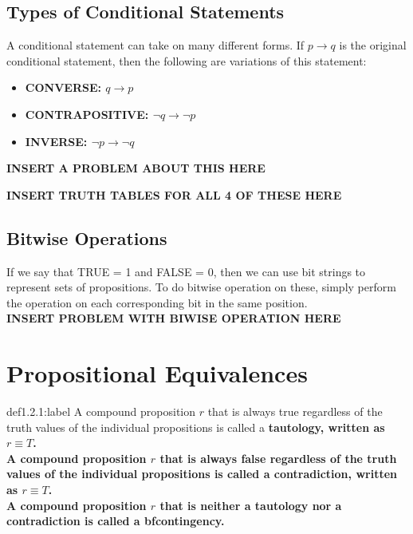 \subsection{Types of Conditional Statements}

A conditional statement can take on many different forms. If $p \rightarrow q$ is the original conditional statement, then the following are variations of this statement:

\begin{itemize}
    \item \bf{CONVERSE:} $q \rightarrow p$
    \item \bf{CONTRAPOSITIVE:} $\neg q \rightarrow \neg p$
    \item \bf{INVERSE:} $\neg p \rightarrow \neg q$
\end{itemize}

\bf{INSERT A PROBLEM ABOUT THIS HERE}

\bf{INSERT TRUTH TABLES FOR ALL 4 OF THESE HERE}


\subsection{Bitwise Operations}

If we say that TRUE = 1 and FALSE = 0, then we can use bit strings to represent sets of propositions. To do bitwise operation on these, simply perform the operation on each corresponding bit in the same position.\\

\bf{INSERT PROBLEM WITH BIWISE OPERATION HERE}



\section{Propositional Equivalences}

\begin{definition}{def1.2.1:label}
    A compound proposition $r$ that is always true regardless of the truth values of the individual propositions is called a \bf{tautology}, written as $r \equiv T$.\\

    A compound proposition $r$ that is always false regardless of the truth values of the individual propositions is called a \bf{contradiction}, written as $r \equiv T$.\\

    A compound proposition $r$ that is neither a tautology nor a contradiction is called a bf{contingency}.
\end{definition}


